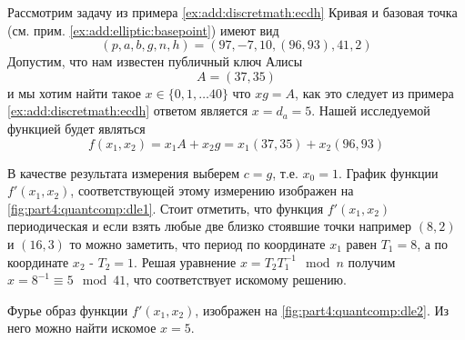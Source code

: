 \begin{example}
Рассмотрим задачу из примера \ref{ex:add:discretmath:ecdh}
Кривая и базовая точка (см. прим. \ref{ex:add:elliptic:basepoint})
имеют вид
\[
(p,a,b,g,n,h) = (97, -7, 10, (96,93), 41, 2)
\]
Допустим, что нам известен публичный ключ Алисы
\[
A = (37, 35)
\]
и мы хотим найти такое $x \in \{0,1, \dots 40\}$ что
$x g = A$, как это следует из примера \ref{ex:add:discretmath:ecdh}
ответом является $x = d_a  = 5$.
Нашей исследуемой функцией будет являться
\[
f\left(x_1,x_2\right) = x_1 A + x_2 g = x_1 (37,35) + x_2 (96,93)
\]



В качестве результата измерения выберем $c = g$, т.е. $x_0 = 1$.
График функции $f'(x_1, x_2)$, соответствующей этому измерению
изображен на \autoref{fig:part4:quantcomp:dle1}. Стоит отметить, что
функция $f'(x_1, x_2)$ периодическая и если взять любые две близко
стоявшие точки например $(8,2)$ и $(16,3)$ то можно заметить, что
период по координате $x_1$ равен $T_1=8$, а по координате $x_2$ - $T_2
= 1$. Решая уравнение $x = T_2 T_1^{-1} \mod n$ получим $x = 8^{-1}
 \equiv 5 \mod 41$, что соответствует искомому решению.



Фурье образ функции $f'(x_1, x_2)$, изображен на
\autoref{fig:part4:quantcomp:dle2}. Из него можно найти искомое $x =
5$. 

\end{example}
